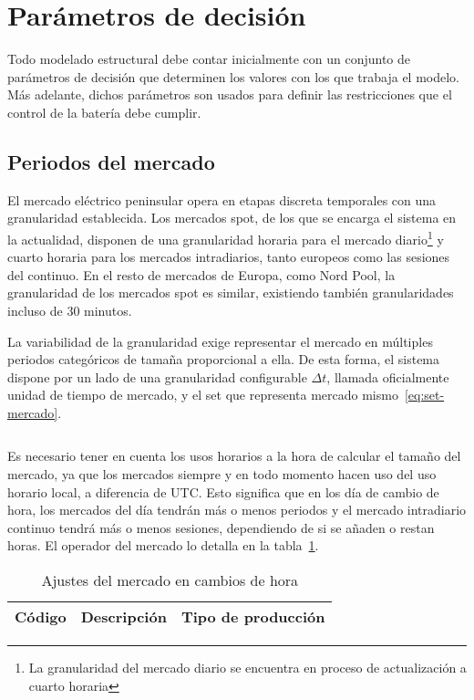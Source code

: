 \section{Parámetros de decisión}
\label{makereference5.1}

Todo modelado estructural debe contar inicialmente con un conjunto de parámetros de decisión que determinen los valores con los que trabaja el modelo. Más adelante, dichos parámetros son usados para definir las restricciones que el control de la batería debe cumplir.

\subsection{Periodos del mercado}
\label{makereference5.1.1}

El mercado eléctrico peninsular opera en etapas discreta temporales con una granularidad establecida. Los mercados spot, de los que se encarga el sistema en la actualidad, disponen de una granularidad horaria para el mercado diario\footnote{La granularidad del mercado diario se encuentra en proceso de actualización a cuarto horaria} y cuarto horaria para los mercados intradiarios, tanto europeos como las sesiones del continuo. En el resto de mercados de Europa, como Nord Pool, la granularidad de los mercados spot es similar, existiendo también granularidades incluso de 30 minutos.

La variabilidad de la granularidad exige representar el mercado en múltiples periodos categóricos de tamaña proporcional a ella. De esta forma, el sistema dispone por un lado de una granularidad configurable \( \Delta t \), llamada oficialmente unidad de tiempo de mercado, y el set que representa mercado mismo~\ref{eq:set-mercado}.

\begin{equation}
  \label{eq:set-mercado}
\end{equation}

Es necesario tener en cuenta los usos horarios a la hora de calcular el tamaño del mercado, ya que los mercados siempre y en todo momento hacen uso del uso horario local, a diferencia de UTC. Esto significa que en los día de cambio de hora, los mercados del día tendrán más o menos periodos y el mercado intradiario continuo tendrá más o menos sesiones, dependiendo de si se añaden o restan horas. El operador del mercado lo detalla en la tabla~\ref{tab:cambio-hora}.

\begin{table}[ht]
  \centering
  \begin{tabular}[c]{|l|l|l|}
    \hline
    Código & Descripción & Tipo de producción\\
    \hline
    \hline
  \end{tabular}
  \caption{Ajustes del mercado en cambios de hora}
  \label{tab:cambio-hora}
\end{table}

